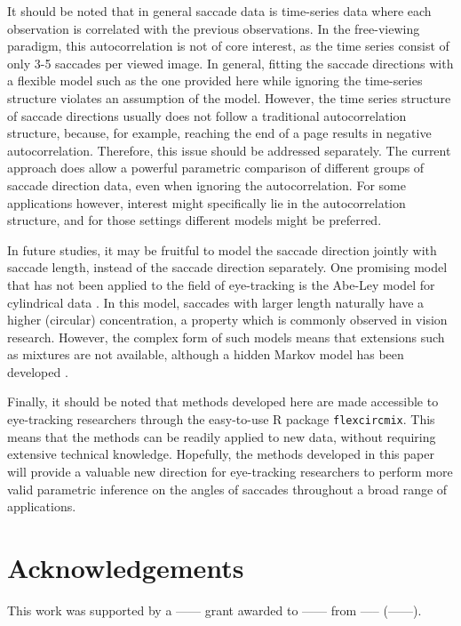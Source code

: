 It should be noted that in general saccade data is time-series data where each observation is correlated with the previous observations. In the free-viewing paradigm, this autocorrelation is not of core interest, as the time series consist of only 3-5 saccades per viewed image. In general, fitting the saccade directions with a flexible model such as the one provided here while ignoring the time-series structure violates an assumption of the model. However, the time series structure of saccade directions usually does not follow a traditional autocorrelation structure, because, for example, reaching the end of a page results in negative autocorrelation. Therefore, this issue should be addressed separately. The current approach does allow a powerful parametric comparison of different groups of saccade direction data, even when ignoring the autocorrelation. For some applications however, interest might specifically lie in the autocorrelation structure, and for those settings different models might be preferred.

In future studies, it may be fruitful to model the saccade direction jointly with saccade length, instead of the saccade direction separately. One promising model that has not been applied to the field of eye-tracking is the Abe-Ley model for cylindrical data \citep{abe2016tractable}. In this model, saccades with larger length naturally have a higher (circular) concentration, a property which is commonly observed in vision research. However, the complex form of such models means that extensions such as mixtures are not available, although a hidden Markov model has been developed \citep{lagona2015hidden}.

Finally, it should be noted that methods developed here are made accessible to eye-tracking researchers through the easy-to-use R package \texttt{flexcircmix}. This means that the methods can be readily applied to new data, without requiring extensive technical knowledge. Hopefully, the methods developed in this paper will provide a valuable new direction for eye-tracking researchers to perform more valid parametric inference on the angles of saccades throughout a broad range of applications.



\section{Acknowledgements}

This work was supported by a ------ grant awarded to ------ from ----- (------).




\newpage

